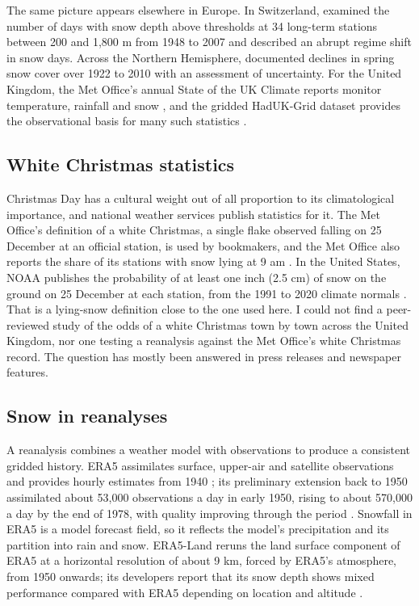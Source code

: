 \documentclass[11pt,a4paper]{article}
\begin{document}
The same picture appears elsewhere in Europe. In Switzerland, \citet{marty2008} examined the number of days with snow depth above thresholds at 34 long-term stations between 200 and 1,800 m from 1948 to 2007 and described an abrupt regime shift in snow days. Across the Northern Hemisphere, \citet{brown2011} documented declines in spring snow cover over 1922 to 2010 with an assessment of uncertainty. For the United Kingdom, the Met Office's annual State of the UK Climate reports monitor temperature, rainfall and snow \citep{kendon2025}, and the gridded HadUK-Grid dataset provides the observational basis for many such statistics \citep{hollis2019}.

\subsection{White Christmas statistics}
Christmas Day has a cultural weight out of all proportion to its climatological importance, and national weather services publish statistics for it. The Met Office's definition of a white Christmas, a single flake observed falling on 25 December at an official station, is used by bookmakers, and the Met Office also reports the share of its stations with snow lying at 9 am \citep{metoffice2024,metoffice2025}. In the United States, NOAA publishes the probability of at least one inch (2.5 cm) of snow on the ground on 25 December at each station, from the 1991 to 2020 climate normals \citep{lindsey2022}. That is a lying-snow definition close to the one used here. I could not find a peer-reviewed study of the odds of a white Christmas town by town across the United Kingdom, nor one testing a reanalysis against the Met Office's white Christmas record. The question has mostly been answered in press releases and newspaper features.

\subsection{Snow in reanalyses}
A reanalysis combines a weather model with observations to produce a consistent gridded history. ERA5 assimilates surface, upper-air and satellite observations and provides hourly estimates from 1940 \citep{hersbach2020}; its preliminary extension back to 1950 assimilated about 53,000 observations a day in early 1950, rising to about 570,000 a day by the end of 1978, with quality improving through the period \citep{bell2021}. Snowfall in ERA5 is a model forecast field, so it reflects the model's precipitation and its partition into rain and snow. ERA5-Land reruns the land surface component of ERA5 at a horizontal resolution of about 9 km, forced by ERA5's atmosphere, from 1950 onwards; its developers report that its snow depth shows mixed performance compared with ERA5 depending on location and altitude \citep{munoz2021}.
\end{document}
